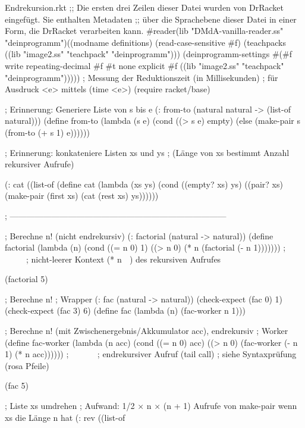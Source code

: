 \begin{filecontents*}{Endrekursion.rkt}
;; Die ersten drei Zeilen dieser Datei wurden von DrRacket eingefügt. Sie enthalten Metadaten
;; über die Sprachebene dieser Datei in einer Form, die DrRacket verarbeiten kann.
#reader(lib "DMdA-vanilla-reader.ss" "deinprogramm")((modname definitions) (read-case-sensitive #f) (teachpacks ((lib "image2.ss" "teachpack" "deinprogramm"))) (deinprogramm-settings #(#f write repeating-decimal #f #t none explicit #f ((lib "image2.ss" "teachpack" "deinprogramm")))))
; Messung der Reduktionszeit (in Millisekunden) 
; für Ausdruck <e> mittels (time <e>)
(require racket/base)  


; Erinnerung: Generiere Liste von s bis e
(: from-to (natural natural -> (list-of natural)))
(define from-to
  (lambda (s e)
    (cond ((> s e) empty)
          (else (make-pair s (from-to (+ s 1) e)))))) 


; Erinnerung: konkateniere Listen xs und ys
; (Länge von xs bestimmt Anzahl rekursiver Aufrufe)

(: cat ((list-of %
(define cat
  (lambda (xs ys)
    (cond ((empty? xs) 
           ys)
          ((pair? xs)
           (make-pair (first xs)
                      (cat (rest xs) ys))))))

; ------------------------------------------------------------------------------

; Berechne n! (nicht endrekursiv)
(: factorial (natural -> natural))
(define factorial
  (lambda (n)
    (cond ((= n 0) 1)
          ((> n 0) (* n (factorial (- n 1)))))))
;                  ^^^^^^^^^^^^^^^^^^^^^^^^
;        nicht-leerer Kontext (* n ▢ ) des rekursiven Aufrufes
           

(factorial 5)


; Berechne n!
; Wrapper
(: fac (natural -> natural))
(check-expect (fac 0) 1)
(check-expect (fac 3) 6)
(define fac
  (lambda (n)
    (fac-worker n 1)))

; Berechne n! (mit Zwischenergebnis/Akkumulator acc), endrekursiv
; Worker
(define fac-worker
  (lambda (n acc)
    (cond ((= n 0) acc)
          ((> n 0) (fac-worker (- n 1) (* n acc))))))
;                  ^^^^^^^^^^^^^^^^^^^^^^^^^^^^^^
;                  endrekursiver Aufruf (tail call)
;                  siehe Syntaxprüfung (rosa Pfeile)

(fac 5)



; Liste xs umdrehen
; Aufwand: 1/2 × n × (n + 1) Aufrufe von make-pair wenn xs die Länge n hat
(: rev ((list-of %


\end{filecontents*}

